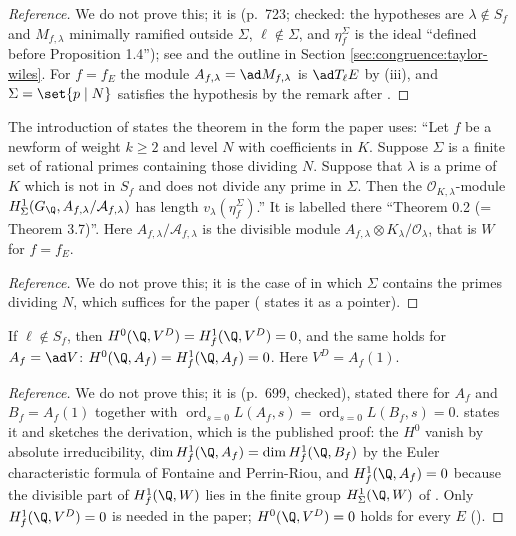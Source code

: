 \begin{proof}[Reference]
We do not prove this; it is \cite[Theorem 3.7]{DFG04} (p.~723; checked: the hypotheses are $\lambda\notin S_f$ and $M_{f,\lambda}$ minimally ramified outside $\Sigma$, $\ell\notin\Sigma$, and
$\eta^\Sigma_f$ is the ideal ``defined before Proposition 1.4''); see \cite[Section 3]{DFG04} and the outline in Section \ref{sec:congruence:taylor-wiles}. For $f=f_E$ the module $A_{f,\lambda}=\ad M_{f,\lambda}$ is $\ad T_\ell E$ by
(iii), and $\Sigma=\set{p\mid N}$ satisfies the hypothesis by the remark after .
\end{proof}

\begin{theorem}\label{thm:congruence:dfg02}
The introduction of \cite{DFG04} states the theorem in the form the paper uses: ``Let $f$ be a newform of weight $k\ge2$ and level $N$ with coefficients in $K$. Suppose $\Sigma$ is a finite
set of rational primes containing those dividing $N$. Suppose that $\lambda$ is a prime of $K$ which is not in $S_f$ and does not divide any prime in $\Sigma$. Then the $\mathcal O_{K,\lambda}$-module
$H^1_\Sigma(G_\Q,A_{f,\lambda}/\mathcal A_{f,\lambda})$ has length $v_\lambda(\eta^\Sigma_f)$.'' It is labelled there ``Theorem 0.2 (= Theorem 3.7)''. Here $A_{f,\lambda}/\mathcal A_{f,\lambda}$ is the divisible module
$A_{f,\lambda}\otimes K_\lambda/\mathcal O_\lambda$, that is $W$ for $f=f_E$.
\end{theorem}

\begin{proof}[Reference]
We do not prove this; it is the case of  in which $\Sigma$ contains the primes dividing $N$, which suffices for the paper ( states it as a pointer).
\end{proof}

\begin{theorem}\label{thm:congruence:dfg27}
If $\ell\notin S_f$, then $H^0(\Q,V^D)=H^1_f(\Q,V^D)=0$, and the same holds for $A_f=\ad V$: $H^0(\Q,A_f)=H^1_f(\Q,A_f)=0$. Here $V^D=A_f(1)$.
\end{theorem}

\begin{proof}[Reference]
We do not prove this; it is \cite[Theorem 2.7]{DFG04} (p.~699, checked), stated there for $A_f$ and $B_f=A_f(1)$ together with $\operatorname{ord}_{s=0}L(A_f,s)=\operatorname{ord}_{s=0}L(B_f,s)=0$.
 states it and sketches the derivation, which is the published proof: the $H^0$ vanish by absolute irreducibility, $\dim H^1_f(\Q,A_f)=\dim H^1_f(\Q,B_f)$ by the Euler characteristic
formula of Fontaine and Perrin-Riou, and $H^1_f(\Q,A_f)=0$ because the divisible part of $H^1_f(\Q,W)$ lies in the finite group $H^1_\Sigma(\Q,W)$ of .
Only $H^1_f(\Q,V^D)=0$ is needed in the paper; $H^0(\Q,V^D)=0$ holds for every $E$ ().
\end{proof}

